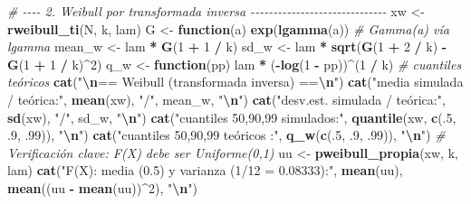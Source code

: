 \documentclass[
  spanish,
]{article}
\newenvironment{Shaded}{\begin{snugshade}}{\end{snugshade}}
\newcommand{\CommentTok}[1]{\textcolor[rgb]{0.56,0.35,0.01}{\textit{#1}}}
\newcommand{\ControlFlowTok}[1]{\textcolor[rgb]{0.13,0.29,0.53}{\textbf{#1}}}
\newcommand{\DecValTok}[1]{\textcolor[rgb]{0.00,0.00,0.81}{#1}}
\newcommand{\FunctionTok}[1]{\textcolor[rgb]{0.13,0.29,0.53}{\textbf{#1}}}
\newcommand{\NormalTok}[1]{#1}
\newcommand{\OtherTok}[1]{\textcolor[rgb]{0.56,0.35,0.01}{#1}}
\newcommand{\SpecialCharTok}[1]{\textcolor[rgb]{0.81,0.36,0.00}{\textbf{#1}}}
\newcommand{\StringTok}[1]{\textcolor[rgb]{0.31,0.60,0.02}{#1}}
\begin{document}
\begin{Shaded}
\begin{Highlighting}[]
\CommentTok{\# {-}{-}{-}{-} 2. Weibull por transformada inversa {-}{-}{-}{-}{-}{-}{-}{-}{-}{-}{-}{-}{-}{-}{-}{-}{-}{-}{-}{-}{-}{-}{-}{-}{-}{-}{-}{-}{-}{-}}
\NormalTok{xw }\OtherTok{\textless{}{-}} \FunctionTok{rweibull\_ti}\NormalTok{(N, k, lam)}
\NormalTok{G  }\OtherTok{\textless{}{-}} \ControlFlowTok{function}\NormalTok{(a) }\FunctionTok{exp}\NormalTok{(}\FunctionTok{lgamma}\NormalTok{(a))                       }\CommentTok{\# Gamma(a) vía lgamma}
\NormalTok{mean\_w }\OtherTok{\textless{}{-}}\NormalTok{ lam }\SpecialCharTok{*} \FunctionTok{G}\NormalTok{(}\DecValTok{1} \SpecialCharTok{+} \DecValTok{1} \SpecialCharTok{/}\NormalTok{ k)}
\NormalTok{sd\_w   }\OtherTok{\textless{}{-}}\NormalTok{ lam }\SpecialCharTok{*} \FunctionTok{sqrt}\NormalTok{(}\FunctionTok{G}\NormalTok{(}\DecValTok{1} \SpecialCharTok{+} \DecValTok{2} \SpecialCharTok{/}\NormalTok{ k) }\SpecialCharTok{{-}} \FunctionTok{G}\NormalTok{(}\DecValTok{1} \SpecialCharTok{+} \DecValTok{1} \SpecialCharTok{/}\NormalTok{ k)}\SpecialCharTok{\^{}}\DecValTok{2}\NormalTok{)}
\NormalTok{q\_w    }\OtherTok{\textless{}{-}} \ControlFlowTok{function}\NormalTok{(pp) lam }\SpecialCharTok{*}\NormalTok{ (}\SpecialCharTok{{-}}\FunctionTok{log}\NormalTok{(}\DecValTok{1} \SpecialCharTok{{-}}\NormalTok{ pp))}\SpecialCharTok{\^{}}\NormalTok{(}\DecValTok{1} \SpecialCharTok{/}\NormalTok{ k)   }\CommentTok{\# cuantiles teóricos}
\FunctionTok{cat}\NormalTok{(}\StringTok{"}\SpecialCharTok{\textbackslash{}n}\StringTok{== Weibull (transformada inversa) ==}\SpecialCharTok{\textbackslash{}n}\StringTok{"}\NormalTok{)}
\FunctionTok{cat}\NormalTok{(}\StringTok{"media simulada / teórica:"}\NormalTok{, }\FunctionTok{mean}\NormalTok{(xw), }\StringTok{"/"}\NormalTok{, mean\_w, }\StringTok{"}\SpecialCharTok{\textbackslash{}n}\StringTok{"}\NormalTok{)}
\FunctionTok{cat}\NormalTok{(}\StringTok{"desv.est. simulada / teórica:"}\NormalTok{, }\FunctionTok{sd}\NormalTok{(xw), }\StringTok{"/"}\NormalTok{, sd\_w, }\StringTok{"}\SpecialCharTok{\textbackslash{}n}\StringTok{"}\NormalTok{)}
\FunctionTok{cat}\NormalTok{(}\StringTok{"cuantiles 50,90,99 simulados:"}\NormalTok{, }\FunctionTok{quantile}\NormalTok{(xw, }\FunctionTok{c}\NormalTok{(.}\DecValTok{5}\NormalTok{, .}\DecValTok{9}\NormalTok{, .}\DecValTok{99}\NormalTok{)), }\StringTok{"}\SpecialCharTok{\textbackslash{}n}\StringTok{"}\NormalTok{)}
\FunctionTok{cat}\NormalTok{(}\StringTok{"cuantiles 50,90,99 teóricos :"}\NormalTok{, }\FunctionTok{q\_w}\NormalTok{(}\FunctionTok{c}\NormalTok{(.}\DecValTok{5}\NormalTok{, .}\DecValTok{9}\NormalTok{, .}\DecValTok{99}\NormalTok{)), }\StringTok{"}\SpecialCharTok{\textbackslash{}n}\StringTok{"}\NormalTok{)}
\CommentTok{\# Verificación clave: F(X) debe ser Uniforme(0,1)}
\NormalTok{uu }\OtherTok{\textless{}{-}} \FunctionTok{pweibull\_propia}\NormalTok{(xw, k, lam)}
\FunctionTok{cat}\NormalTok{(}\StringTok{"F(X): media (0.5) y varianza (1/12 = 0.08333):"}\NormalTok{, }\FunctionTok{mean}\NormalTok{(uu), }\FunctionTok{mean}\NormalTok{((uu }\SpecialCharTok{{-}} \FunctionTok{mean}\NormalTok{(uu))}\SpecialCharTok{\^{}}\DecValTok{2}\NormalTok{), }\StringTok{"}\SpecialCharTok{\textbackslash{}n}\StringTok{"}\NormalTok{)}


\end{Highlighting}
\end{Shaded}
\end{document}

